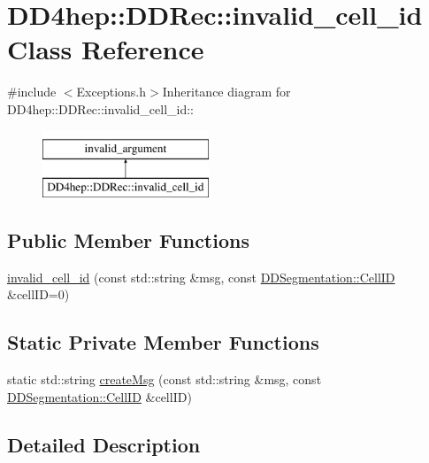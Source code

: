 \hypertarget{class_d_d4hep_1_1_d_d_rec_1_1invalid__cell__id}{
\section{DD4hep::DDRec::invalid\_\-cell\_\-id Class Reference}
\label{class_d_d4hep_1_1_d_d_rec_1_1invalid__cell__id}
}


{\ttfamily \#include $<$Exceptions.h$>$}Inheritance diagram for DD4hep::DDRec::invalid\_\-cell\_\-id::\begin{figure}[H]
\begin{center}
\leavevmode
\includegraphics[height=2cm]{class_d_d4hep_1_1_d_d_rec_1_1invalid__cell__id}
\end{center}
\end{figure}
\subsection*{Public Member Functions}
\begin{DoxyCompactItemize}
\item 
\hyperlink{class_d_d4hep_1_1_d_d_rec_1_1invalid__cell__id_a242e8977aced3fb69db5bba5f876fe99}{invalid\_\-cell\_\-id} (const std::string \&msg, const \hyperlink{namespace_d_d4hep_1_1_d_d_segmentation_ac7af071d85cb48820914434a07e21ba1}{DDSegmentation::CellID} \&cellID=0)
\end{DoxyCompactItemize}
\subsection*{Static Private Member Functions}
\begin{DoxyCompactItemize}
\item 
static std::string \hyperlink{class_d_d4hep_1_1_d_d_rec_1_1invalid__cell__id_a62d6a8a99f7edcfe1a506f90640d76a6}{createMsg} (const std::string \&msg, const \hyperlink{namespace_d_d4hep_1_1_d_d_segmentation_ac7af071d85cb48820914434a07e21ba1}{DDSegmentation::CellID} \&cellID)
\end{DoxyCompactItemize}


\subsection{Detailed Description}



